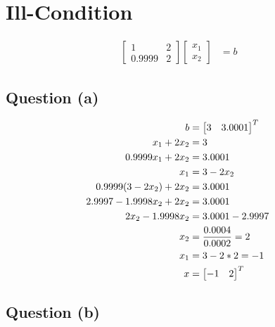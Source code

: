 \section{Ill-Condition}
	
	\begin{align}
		\begin{bmatrix}
			1 & 2 \\
			0.9999 & 2
		\end{bmatrix}
		\begin{bmatrix}
			x_{1} \\
			x_{2}
		\end{bmatrix}
		&= b&
		\label{eq:74}
	\end{align}

	\subsection{Question (a)}

		\begin{align}
			b &=
			\begin{bmatrix}
				3 & 3.0001
			\end{bmatrix}^{T}
			& \\
			x_{1} + 2x_{2} &= 3& \notag \\
			0.9999x_{1} + 2x_{2} &= 3.0001& \notag \\
			x_{1} &= 3 - 2x_{2}& \notag \\
			0.9999(3 - 2x_{2}) + 2x_{2} &= 3.0001& \notag \\
			2.9997 - 1.9998x_{2} + 2x_{2} &= 3.0001& \notag \\
			2x_{2} - 1.9998x_{2} &= 3.0001 - 2.9997& \notag \\
			x_{2} &= \frac{0.0004}{0.0002} = 2& \\
			x_{1} &= 3 - 2*2 = -1& \\
			x &=
			\begin{bmatrix}
				-1 & 2
			\end{bmatrix}^{T}
		\end{align}

	\subsection{Question (b)}

